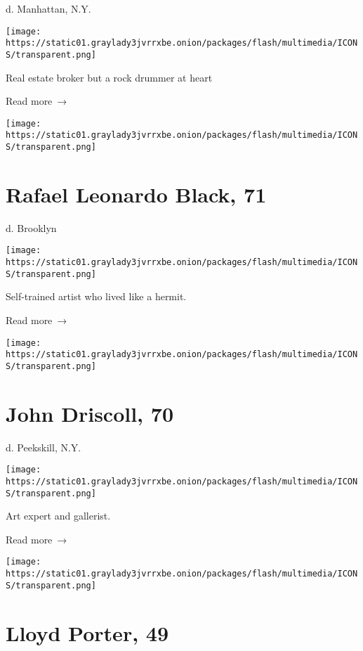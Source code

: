 d. Manhattan, N.Y.

\texttt{[image: https://static01.graylady3jvrrxbe.onion/packages/flash/multimedia/ICONS/transparent.png]}

Real estate broker but a rock drummer at heart

 Read more~→

\href{https://www.nytimes3xbfgragh.onion/2020/05/23/arts/rafael-leonardo-black-dead-coronavirus.html}{}

\texttt{[image: https://static01.graylady3jvrrxbe.onion/packages/flash/multimedia/ICONS/transparent.png]}

\hypertarget{rafael-leonardo-black-71}{%
\section{Rafael Leonardo Black, 71}\label{rafael-leonardo-black-71}}

d. Brooklyn

\texttt{[image: https://static01.graylady3jvrrxbe.onion/packages/flash/multimedia/ICONS/transparent.png]}

Self-trained artist who lived like a hermit.

 Read more~→

\href{https://www.nytimes3xbfgragh.onion/2020/05/22/arts/john-driscoll-dead.html}{}

\texttt{[image: https://static01.graylady3jvrrxbe.onion/packages/flash/multimedia/ICONS/transparent.png]}

\hypertarget{john-driscoll-70}{%
\section{John Driscoll, 70}\label{john-driscoll-70}}

d. Peekskill, N.Y.

\texttt{[image: https://static01.graylady3jvrrxbe.onion/packages/flash/multimedia/ICONS/transparent.png]}

Art expert and gallerist.

 Read more~→

\href{https://www.nytimes3xbfgragh.onion/2020/05/22/obituaries/lloyd-porter-dead-coronavirus.html}{}

\texttt{[image: https://static01.graylady3jvrrxbe.onion/packages/flash/multimedia/ICONS/transparent.png]}

\hypertarget{lloyd-porter-49}{%
\section{Lloyd Porter, 49}\label{lloyd-porter-49}}

